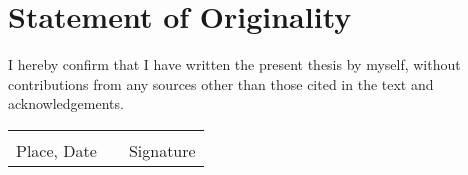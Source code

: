 \chapter{Statement of Originality}

I hereby confirm that I have written the present thesis by myself, without contributions from any sources other than those cited in the text and acknowledgements.

\vspace{4cm}

\noindent
\begin{tabular}{@{}p{2.55in}@{}p{1in}p{2.55in}@{}}
    \dotfill & & \dotfill \\
    Place, Date & & Signature\\
\end{tabular}
